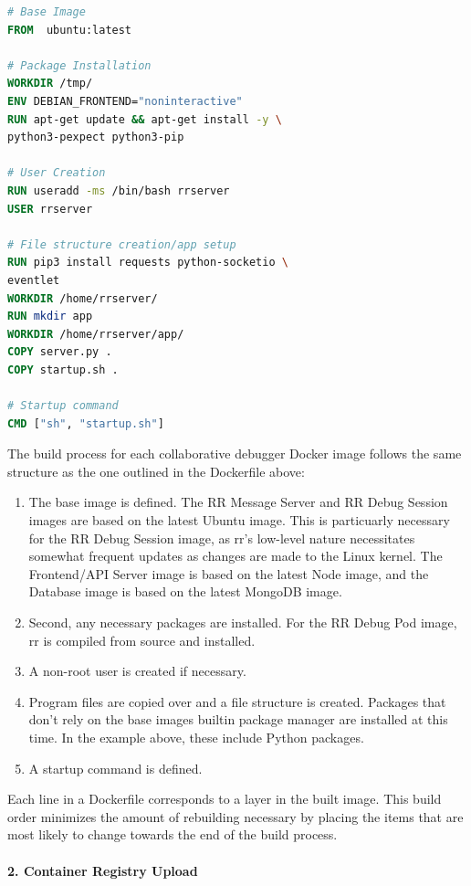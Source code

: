 \documentclass[12pt]{article}
\begin{document}
\begin{lstlisting}[language=Dockerfile,caption={RR Message Server Dockerfile},captionpos=b]
# Base Image
FROM  ubuntu:latest

# Package Installation
WORKDIR /tmp/
ENV DEBIAN_FRONTEND="noninteractive"
RUN apt-get update && apt-get install -y \
python3-pexpect python3-pip

# User Creation
RUN useradd -ms /bin/bash rrserver
USER rrserver

# File structure creation/app setup
RUN pip3 install requests python-socketio \
eventlet
WORKDIR /home/rrserver/
RUN mkdir app
WORKDIR /home/rrserver/app/
COPY server.py .
COPY startup.sh .

# Startup command
CMD ["sh", "startup.sh"]
\end{lstlisting}

The build process for each collaborative debugger Docker image follows
the same structure as the one outlined in the Dockerfile above:

\begin{enumerate}
\item The base image is defined. The RR Message Server and RR Debug
  Session images are based on the latest Ubuntu image.  This is
  particuarly necessary for the RR Debug Session image, as rr's
  low-level nature necessitates somewhat frequent updates as changes
  are made to the Linux kernel.  The Frontend/API Server image is
  based on the latest Node image, and the Database image is based on
  the latest MongoDB image.
\item Second, any necessary packages are installed.  For the RR Debug
  Pod image, rr is compiled from source and installed.
\item A non-root user is created if necessary.
\item Program files are copied over and a file structure is created.
  Packages that don't rely on the base images builtin package manager
  are installed at this time.  In the example above, these include
  Python packages.
\item A startup command is defined.
\end{enumerate}

Each line in a Dockerfile corresponds to a layer in the built image.
This build order minimizes the amount of rebuilding necessary by
placing the items that are most likely to change towards the end of
the build process.

\paragraph{2. Container Registry Upload}
\end{document}
